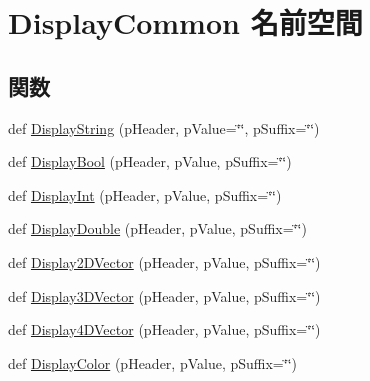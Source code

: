 \hypertarget{namespace_display_common}{}\section{Display\+Common 名前空間}
\label{namespace_display_common}
\subsection*{関数}
\begin{DoxyCompactItemize}
\item 
def \hyperlink{namespace_display_common_aac12070f940253478cc76bc2d44ad15f}{Display\+String} (p\+Header, p\+Value=\char`\"{}\char`\"{}, p\+Suffix=\char`\"{}\char`\"{})
\item 
def \hyperlink{namespace_display_common_a2c249f8d9928bf838f7b5bb7c0ca8736}{Display\+Bool} (p\+Header, p\+Value, p\+Suffix=\char`\"{}\char`\"{})
\item 
def \hyperlink{namespace_display_common_a3389e08fe0ba868c01bf5f3831086578}{Display\+Int} (p\+Header, p\+Value, p\+Suffix=\char`\"{}\char`\"{})
\item 
def \hyperlink{namespace_display_common_a0f6cae7a685905873e5b56371c902b82}{Display\+Double} (p\+Header, p\+Value, p\+Suffix=\char`\"{}\char`\"{})
\item 
def \hyperlink{namespace_display_common_a4e3c85b5eb936b6a95d660e8157c6a14}{Display2\+D\+Vector} (p\+Header, p\+Value, p\+Suffix=\char`\"{}\char`\"{})
\item 
def \hyperlink{namespace_display_common_af97c41fa4dea77cbe28d38f172849f5f}{Display3\+D\+Vector} (p\+Header, p\+Value, p\+Suffix=\char`\"{}\char`\"{})
\item 
def \hyperlink{namespace_display_common_ac10285d2dff6dd7fc62f6575316b0e4d}{Display4\+D\+Vector} (p\+Header, p\+Value, p\+Suffix=\char`\"{}\char`\"{})
\item 
def \hyperlink{namespace_display_common_a960eed99c7344a16f151e8da6b614efd}{Display\+Color} (p\+Header, p\+Value, p\+Suffix=\char`\"{}\char`\"{})
\end{DoxyCompactItemize}



